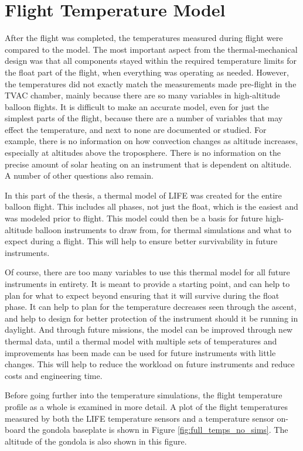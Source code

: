 \section{Flight Temperature Model}\label{flight_temp_model}
After the flight was completed, the temperatures measured during flight were compared to the model. The most important aspect from the thermal-mechanical design was that all components stayed within the required temperature limits for the float part of the flight, when everything was operating as needed. However, the temperatures did not exactly match the measurements made pre-flight in the TVAC chamber, mainly because there are so many variables in high-altitude balloon flights. It is difficult to make an accurate model, even for just the simplest parts of the flight, because there are a number of variables that may effect the temperature, and next to none are documented or studied. For example, there is no information on how convection changes as altitude increases, especially at altitudes above the troposphere. There is no information on the precise amount of solar heating on an instrument that is dependent on altitude. A number of other questions also remain.

In this part of the thesis, a thermal model of LIFE was created for the entire balloon flight. This includes all phases, not just the float, which is the easiest and was modeled prior to flight. This model could then be a basis for future high-altitude balloon instruments to draw from, for thermal simulations and what to expect during a flight. This will help to ensure better survivability in future instruments.

Of course, there are too many variables to use this thermal model for all future instruments in entirety. It is meant to provide a starting point, and can help to plan for what to expect beyond ensuring that it will survive during the float phase. It can help to plan for the temperature decreases seen through the ascent, and help to design for better protection of the instrument should it be running in daylight. And through future missions, the model can be improved through new thermal data, until a thermal model with multiple sets of temperatures and improvements has been made can be used for future instruments with little changes. This will help to reduce the workload on future instruments and reduce costs and engineering time. 

Before going further into the temperature simulations, the flight temperature profile as a whole is examined in more detail. A plot of the flight temperatures measured by both the LIFE temperature sensors and a temperature sensor on-board the gondola baseplate is shown in Figure \ref{fig:full_temps_no_sims}. The altitude of the gondola is also shown in this figure.

